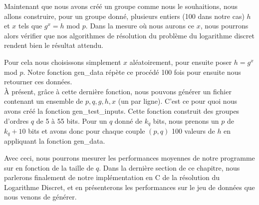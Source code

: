 		    Maintenant que nous avons créé un groupe comme nous le souhaitions, nous allons construire, pour un groupe donné, plusieurs entiers (100 dans notre cas) $h$ et $x$ tels que $g^x = h$ mod $p$. Dans la mesure où nous aurons ce $x$, nous pourrons alors vérifier que nos algorithmes de résolution du problème du logarithme discret rendent bien le résultat attendu.

		    Pour cela nous choisissons simplement $x$ aléatoirement, pour ensuite poser $h = g^x$ mod $p$. Notre fonction gen\_data répète ce procédé 100 fois pour ensuite nous retourner ces données.\\

        À présent, grâce à cette dernière fonction, nous pouvons générer un fichier contenant un ensemble de $p, q, g, h, x$ (un par ligne). C'est ce pour quoi nous avons créé la fonction gen\_test\_inputs. Cette fonction construit des groupes d'ordres $q$ de 5 à 55 bits. Pour un $q$ donné de $k_q$ bits, nous prenons un $p$ de $k_q + 10$ bits et avons donc pour chaque couple $(p,q)$ 100 valeurs de $h$ en appliquant la fonction gen\_data.

        Avec ceci, nous pourrons mesurer les performances moyennes de notre programme sur en fonction de la taille de $q$. Dans la dernière section de ce chapitre, nous parlerons finalement de notre implémentation en C de la résolution du Logarithme Discret, et en présenterons les performances sur le jeu de données que nous venons de générer.
